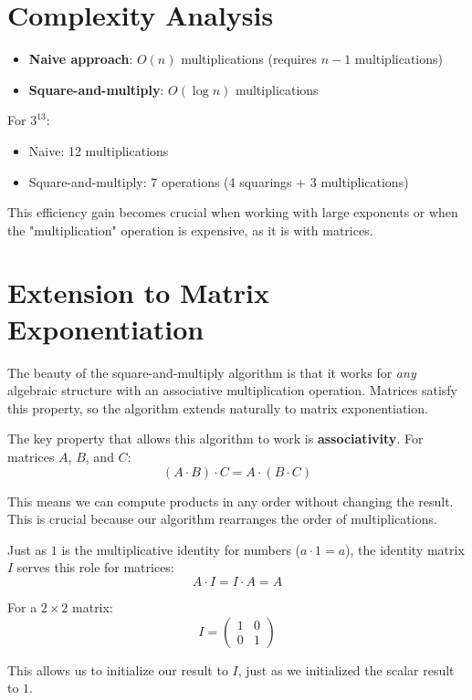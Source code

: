 \documentclass{article}
\begin{document}
	\section{Complexity Analysis}
	
	\begin{itemize}
		\item \textbf{Naive approach}: $O(n)$ multiplications (requires $n-1$ multiplications)
		\item \textbf{Square-and-multiply}: $O(\log n)$ multiplications
	\end{itemize}
	
	For $3^{13}$:
	\begin{itemize}
		\item Naive: 12 multiplications
		\item Square-and-multiply: 7 operations (4 squarings + 3 multiplications)
	\end{itemize}
	
	This efficiency gain becomes crucial when working with large exponents or when the "multiplication" operation is expensive, as it is with matrices.
	
	\section{Extension to Matrix Exponentiation}
	
	The beauty of the square-and-multiply algorithm is that it works for \emph{any} algebraic structure with an associative multiplication operation. Matrices satisfy this property, so the algorithm extends naturally to matrix exponentiation.

	The key property that allows this algorithm to work is \textbf{associativity}. For matrices $A$, $B$, and $C$:
	\[
	(A \cdot B) \cdot C = A \cdot (B \cdot C)
	\]
	
	This means we can compute products in any order without changing the result. This is crucial because our algorithm rearranges the order of multiplications.
	
	Just as $1$ is the multiplicative identity for numbers ($a \cdot 1 = a$), the identity matrix $I$ serves this role for matrices:
	\[
	A \cdot I = I \cdot A = A
	\]
	
	For a $2 \times 2$ matrix:
	\[
	I = \begin{pmatrix} 1 & 0 \\ 0 & 1 \end{pmatrix}
	\]
	
	This allows us to initialize our result to $I$, just as we initialized the scalar result to $1$.
	
\end{document}

